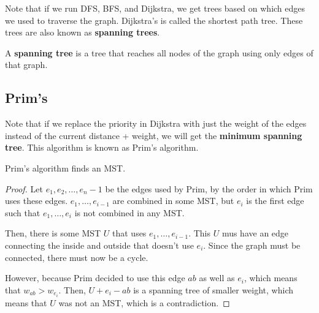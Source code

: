 
Note that if we run DFS, BFS, and Dijkstra, we get trees based on which edges we used to traverse the graph. Dijkstra's is called the shortest path tree. These trees are also known as \textbf{spanning trees}.

\begin{definition}
	A \textbf{spanning tree} is a tree that reaches all nodes of the graph using only edges of that graph.
\end{definition}

\subsection{Prim's}

Note that if we replace the priority in Dijkstra with just the weight of the edges instead of the current distance + weight, we will get the \textbf{minimum spanning tree}. This algorithm is known as Prim's algorithm.

\begin{theorem}
	Prim's algorithm finds an MST.
\end{theorem}
\begin{proof}
	Let \( e_{1}, e_{2}, \ldots, e_n-1  \) be the edges used by Prim, by the order in which Prim uses these edges. \( e_{1}, \ldots , e_{i-1} \) are combined in some MST, but \( e_i \) is the first edge such that \( e_{1}, \ldots , e_i \) is not combined in any MST.

	Then, there is some MST \( U \) that uses \( e_{1}, \ldots , e_{i-1} \). This \( U \) mus have an edge connecting the inside and outside that doesn't use \( e_i \). Since the graph must be connected, there must now be a cycle.

	However, because Prim decided to use this edge \( ab \) as well as \( e_i \), which means that \( w_{ab} > w_{e_i} \). Then, \( U + e_i - ab \) is a spanning tree of smaller weight, which means that \( U \) was not an MST, which is a contradiction.
\end{proof}
